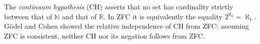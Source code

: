 
The \emph{continuum hypothesis} (CH) asserts that no set has cardinality strictly between that of $\mathbb N$ and that of $\mathbb R$. In ZFC it is equivalently the equality $2^{\aleph_0}=\aleph_1$. Gödel and Cohen showed the relative independence of CH from ZFC: assuming ZFC is consistent, neither CH nor its negation follows from ZFC.
